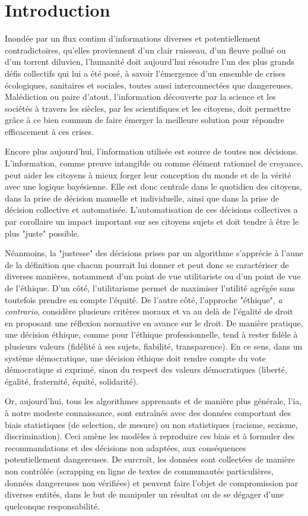 \section{Introduction}

Inondée par un flux continu d'informations diverses et potentiellement contradictoires, qu'elles proviennent d'un clair ruisseau, d'un fleuve pollué ou d'un torrent diluvien, l'humanité doit aujourd'hui résoudre l'un des plus grands défis collectifs qui lui a été posé, à savoir l'émergence d'un ensemble de crises écologiques, sanitaires et sociales, toutes aussi interconnectées que dangereuses. Malédiction ou paire d'atout, l'information découverte par la science et les sociétés à travers les siècles, par les scientifiques et les citoyens, doit permettre grâce à ce bien commun de faire émerger la meilleure solution pour répondre efficacement à ces crises. 

Encore plus aujourd'hui, l'information utilisée est source de toutes nos décisions. L'information, comme preuve intangible ou comme élément rationnel de croyance, peut aider les citoyens à mieux forger leur conception du monde et de la vérité avec une logique bayésienne. Elle est donc centrale dans le quotidien des citoyens, dans la prise de décision manuelle et individuelle, ainsi que dans la prise de décision collective et automatisée. L'automatisation de ces décisions collectives a par corollaire un impact important sur ses citoyens sujets et doit tendre à être le plus "juste" possible.

Néanmoins, la "justesse" des décisions prises par un algorithme s'apprécie à l'aune de la définition que chacun pourrait lui donner et peut donc se caractériser de diverses manières, notamment d'un point de vue utilitariste ou d'un point de vue de l'éthique. D'un côté, l'utilitarisme permet de maximiser l'utilité agrégée sans toutefois prendre en compte l'équité. De l'autre côté, l'approche "éthique", \textit{a contrario}, considère plusieurs critères moraux et va au delà de l'égalité de droit en proposant une réflexion normative en avance sur le droit. De manière pratique, une décision éthique, comme pour l'éthique professionnelle, tend à rester fidèle à plusieurs valeurs (fidélité à ses sujets, fiabilité, transparence). En ce sens, dans un système démocratique, une décision éthique doit rendre compte du vote démocratique si exprimé, sinon du respect des valeurs démocratiques (liberté, égalité, fraternité, équité, solidarité).

Or, aujourd'hui, tous les algorithmes apprenants et de manière plus générale, l'\Gls{ia}, à notre modeste connaissance, sont entraînés avec des données comportant des biais statistiques (de selection, de mesure) ou non statistiques (racisme, sexisme, discrimination). Ceci amène les modèles à reproduire ces biais et à formuler des recommandations et des décisions non adaptées, aux conséquences potentiellement dangereuses. De surcroît, les données sont collectées de manière non contrôlée (scrapping en ligne de textes de communautés particulières, données dangereuses non vérifiées) et peuvent faire l'objet de compromission par diverses entités, dans le but de manipuler un résultat ou de se dégager d'une quelconque responsabilité.

